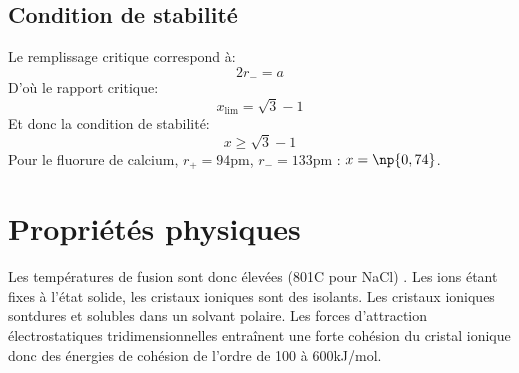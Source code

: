 \subsection{Condition de stabilité}
Le remplissage critique correspond à:
\begin{equation}
    2r_- = a
    \label{eq:3_caf2_lim_r-a}
\end{equation}
D'où le rapport critique:
\begin{equation}
    x_\text{lim} = \sqrt{3} - 1
    \label{eq:3_caf2_xlim}
\end{equation}
Et donc la condition de stabilité:
\begin{equation}
    \boxed{x \geq \sqrt{3} - 1}
    \label{eq:3_caf2_stabx}
\end{equation}
Pour le fluorure de calcium, $r_+ = 94$pm, $r_- = 133$pm :
$x = \np{0,74}$.


\section{Propriétés physiques}
Les températures de fusion sont donc élevées (801\degre C pour NaCl)
 .
Les ions étant fixes à l'état solide, les cristaux ioniques sont des isolants.
 Les cristaux ioniques sontdures et solubles
dans un solvant polaire. Les forces d’attraction électrostatiques
tridimensionnelles entraînent une forte cohésion du cristal ionique donc des 
énergies de cohésion de l’ordre de 100 à 600kJ/mol.
